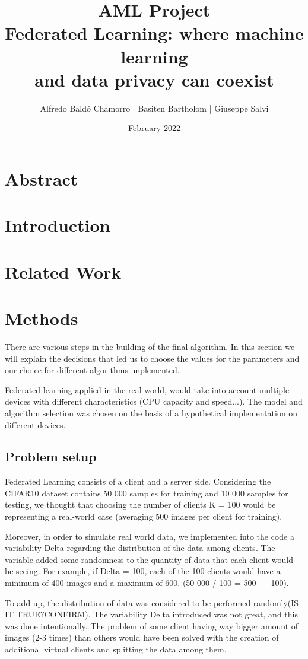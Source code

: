 \documentclass[twocolumn]{article}
\title{AML Project
\\Federated Learning: where machine learning \\and data privacy can coexist
}
\author{
Alfredo Baldó Chamorro | 
Basiten Bartholom |
Giuseppe Salvi
}
\date{February 2022}
\begin{document}
\maketitle

\section{Abstract}
\section{Introduction} %
\section{Related Work} %
\section{Methods} %
There are various steps in the building of the final algorithm. In this section we will explain the decisions that led us to choose the values for the parameters and our choice for different algorithms implemented. 

Federated learning applied in the real world, would take into account multiple devices with different characteristics (CPU capacity and speed...). The model and algorithm selection was chosen on the basis of a hypothetical implementation on different devices.  

\subsection{Problem setup}
Federated Learning consists of a client and a server side. Considering the CIFAR10 dataset contains 50 000 samples for training and 10 000 samples for testing, we thought that choosing the number of clients K = 100 would be representing a real-world case (averaging 500 images per client for training). 

Moreover, in order to simulate real world data, we implemented into the code a variability Delta regarding the distribution of the data among clients. The variable added some randomness to the quantity of data that each client would be seeing. For example, if Delta = 100, each of the 100 clients would have a minimum of 400 images and a maximum of 600. (50 000 / 100 = 500 +- 100).

To add up, the distribution of data was considered to be performed randomly(IS IT TRUE?CONFIRM). The variability Delta introduced was not great, and this was done intentionally. The problem of some client having way bigger amount of images (2-3 times) than others would have been solved with the creation of additional virtual clients and splitting the data among them. 
\end{document}
